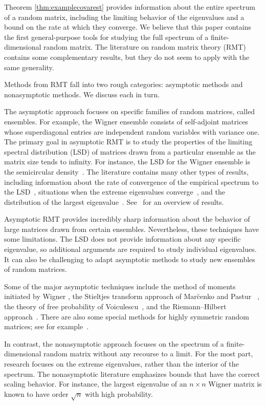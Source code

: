 \documentclass[11pt,letterpaper,twoside,reqno,nosumlimits]{amsart}
\theoremstyle{remark}
\numberwithin{equation}{section}
\numberwithin{thm}{section}
\numberwithin{prop}{section}
\numberwithin{defn}{section}
\numberwithin{remark}{section}
\begin{document}
Theorem \ref{thm:examplecovarest} provides information about the entire spectrum of a random matrix, including the limiting behavior of the eigenvalues and a bound on the rate at which they converge. We believe that this paper contains the first general-purpose tools for studying the full spectrum of a finite-dimensional random matrix. The literature on random matrix theory (RMT) contains some complementary results, but they do not seem to apply with the same generality.

Methods from RMT fall into two rough categories: asymptotic methods and nonasymptotic methods. We discuss each in turn.

The asymptotic approach focuses on specific families of random matrices, called ensembles. For example, the Wigner ensemble consists of self-adjoint matrices whose superdiagonal entries are independent random variables with variance one. The primary goal in asymptotic RMT is to study the properties of the limiting spectral distribution (LSD) of matrices drawn from a particular ensemble as the matrix size tends to infinity. For instance, the LSD for the Wigner ensemble is the semicircular density~\cite{Wigner}. The literature contains many other types of results, including information about the rate of convergence of the empirical spectrum to the LSD~\cite{CB04}, situations when the extreme eigenvalues converge~\cite{BY88}, and the distribution of the largest eigenvalue~\cite{Tracy--Widom}. See~\cite{Bai99, BS10} for an overview of results.

Asymptotic RMT provides incredibly sharp information about the behavior of large matrices drawn from certain ensembles. Nevertheless, these techniques have some limitations. The LSD does not provide information about any specific eigenvalue, so additional arguments are required to study individual eigenvalues. It can also be challenging to adapt asymptotic methods to study new ensembles of random matrices.

Some of the major asymptotic techniques include the method of moments initiated by Wigner \cite{Wigner}, the Stieltjes transform approach of Mar\u{c}enko and Pastur ~\cite{MarcenkoPastur}, the theory of free probability of Voiculescu~\cite{Voi91}, and the Riemann--Hilbert approach~\cite{Dei99}. There are also some special methods for highly symmetric random matrices; see for example~\cite{Mui08,Ede88}.

In contrast, the nonasymptotic approach focuses on the spectrum of a finite-dimensional random matrix without any recourse to a limit. For the most part, research focuses on the extreme eigenvalues, rather than the interior of the spectrum. The nonasymptotic literature emphasizes bounds that have the correct scaling behavior. For instance, the largest eigenvalue of an $n \times n$ Wigner matrix is known to have order $\sqrt{n}$ with high probability.
\end{document}
